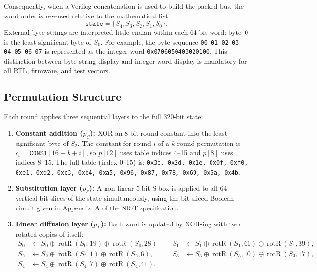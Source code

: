 \documentclass[11pt,a4paper]{article}
\begin{document}
Consequently, when a Verilog concatenation is used to build the packed bus,
the word order is reversed relative to the mathematical list:
\[
  \texttt{state} = \{S_4, S_3, S_2, S_1, S_0\}.
\]
External byte strings are interpreted little-endian within each 64-bit word:
byte~0 is the least-significant byte of $S_0$. For example, the byte sequence
\texttt{00 01 02 03 04 05 06 07} is represented as the integer word
\texttt{0x0706050403020100}. This distinction between byte-string display and
integer-word display is mandatory for all RTL, firmware, and test vectors.

\subsection{Permutation Structure}

Each round applies three sequential layers to the full 320-bit state:

\begin{enumerate}
  \item \textbf{Constant addition ($p_C$):} XOR an 8-bit round constant
        into the least-significant byte of $S_2$. The constant for round $i$
        of a $k$-round permutation is $c_i = \texttt{CONST}[16 - k + i]$,
        so $p[12]$ uses table indices 4--15 and $p[8]$ uses indices 8--15.
        The full table (index 0--15) is:
        \texttt{0x3c, 0x2d, 0x1e, 0x0f, 0xf0, 0xe1, 0xd2, 0xc3,
                0xb4, 0xa5, 0x96, 0x87, 0x78, 0x69, 0x5a, 0x4b}.

  \item \textbf{Substitution layer ($p_S$):} A non-linear 5-bit S-box is
        applied to all 64 vertical bit-slices of the state simultaneously,
        using the bit-sliced Boolean circuit given in Appendix~A of
        the NIST specification.

  \item \textbf{Linear diffusion layer ($p_L$):} Each word is updated
        by XOR-ing with two rotated copies of itself:
        \begin{align*}
          S_0 &\leftarrow S_0 \oplus \operatorname{rotR}(S_0,19) \oplus \operatorname{rotR}(S_0,28), \quad&
          S_1 &\leftarrow S_1 \oplus \operatorname{rotR}(S_1,61) \oplus \operatorname{rotR}(S_1,39), \\
          S_2 &\leftarrow S_2 \oplus \operatorname{rotR}(S_2, 1) \oplus \operatorname{rotR}(S_2, 6), \quad&
          S_3 &\leftarrow S_3 \oplus \operatorname{rotR}(S_3,10) \oplus \operatorname{rotR}(S_3,17), \\
          S_4 &\leftarrow S_4 \oplus \operatorname{rotR}(S_4, 7) \oplus \operatorname{rotR}(S_4,41).
        \end{align*}
\end{enumerate}
\end{document}
